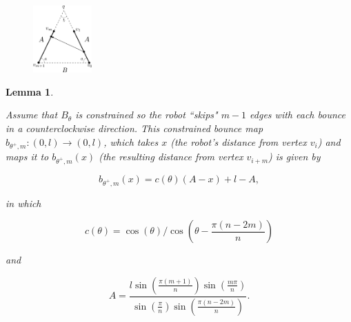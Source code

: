 \documentclass[letterpaper, 10 pt, conference]{ieeeconf}  %
\newtheorem{lemma}{\bf Lemma}
\begin{document}
\begin{figure}[bh]
\centering
\includegraphics[width=0.2\textwidth]{../figs/gen_bounce.pdf}
\end{figure}

\begin{lemma} \label{Lemma:3}

Assume that $B_{\theta}$ is constrained so the robot ``skips" $m-1$ edges with
each bounce in a counterclockwise direction. This constrained bounce
map $b_{\theta^+,m} : (0, l) \to (0, l)$, which takes $x$ (the
robot's distance from vertex $v_i$) and maps it to $b_{\theta^+,m}(x)$
(the resulting distance from vertex $v_{i+m}$) is given by

\begin{equation} \label{b-one-bounce}
b_{\theta^+,m}(x) = c(\theta)(A-x) + l - A,
\end{equation}


\noindent in which

\begin{equation} \label{equation:c_theta}
c(\theta) = \cos(\theta)/\cos \left(\theta - \frac{\pi(n-2m)}{n}\right)
\end{equation}

\noindent and

\begin{equation} \label{equation:A}
A = \frac{l \sin(\frac{\pi(m+1)}{n}) \sin( \frac{m \pi}{n} )}{ \sin(
\frac{\pi}{n} ) \sin( \frac{\pi(n-2m)}{n} ) } .
\end{equation}

%
\end{lemma}
\end{document}
